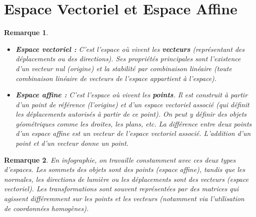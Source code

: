 \documentclass{article}
\newtheorem{remark}{Remarque}
\begin{document}
\section{Espace Vectoriel et Espace Affine}
\begin{remark}
\begin{itemize}
    \item \textbf{Espace vectoriel :} C'est l'espace où vivent les \textbf{vecteurs} (représentant des déplacements ou des directions). Ses propriétés principales sont l'existence d'un vecteur nul (origine) et la stabilité par combinaison linéaire (toute combinaison linéaire de vecteurs de l'espace appartient à l'espace).
    \item \textbf{Espace affine :} C'est l'espace où vivent les \textbf{points}. Il est construit à partir d'un point de référence (l'origine) et d'un espace vectoriel associé (qui définit les déplacements autorisés à partir de ce point). On peut y définir des objets géométriques comme les droites, les plans, etc. La différence entre deux points d'un espace affine est un vecteur de l'espace vectoriel associé. L'addition d'un point et d'un vecteur donne un point.
\end{itemize}
\end{remark}
\begin{remark}
En infographie, on travaille constamment avec ces deux types d'espaces. Les sommets des objets sont des points (espace affine), tandis que les normales, les directions de lumière ou les déplacements sont des vecteurs (espace vectoriel). Les transformations sont souvent représentées par des matrices qui agissent différemment sur les points et les vecteurs (notamment via l'utilisation de coordonnées homogènes).
\end{remark}
\end{document}
